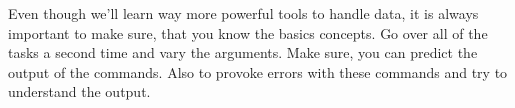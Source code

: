 \begin{challenge}
    \begin{advice}
        Even though we'll learn way more powerful tools to handle data, it is always important to make sure, that you know the basics concepts. 
        Go over all of the tasks a second time and vary the arguments. 
        Make sure, you can predict the output of the commands.
        Also to provoke errors with these commands and try to understand the output.
    \end{advice}
\end{challenge}
    
